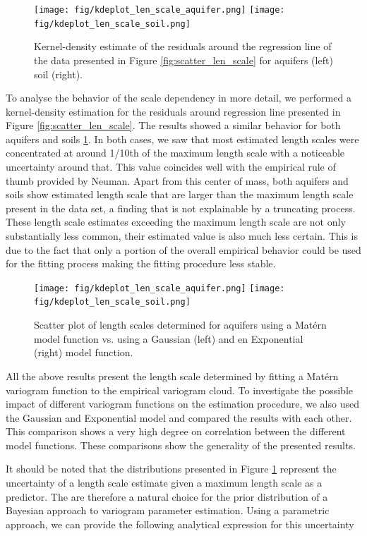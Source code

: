 \documentclass{article}
\begin{document}
\begin{figure}[ht]
    \texttt{[image: fig/kdeplot\_len\_scale\_aquifer.png]}
    \texttt{[image: fig/kdeplot\_len\_scale\_soil.png]}
    \caption{Kernel-density estimate of the residuals around the regression line of the data presented in Figure \ref{fig:scatter_len_scale} for aquifers (left) soil (right).}
    \label{fig:kdeplot_len_scale}
\end{figure}

To analyse the behavior of the scale dependency in more detail, we performed a kernel-density estimation for the residuals around regression line presented in Figure \ref{fig:scatter_len_scale}. The results showed a similar behavior for both aquifers and soils \ref{fig:kdeplot_len_scale}. In both cases, we saw that most estimated length scales were concentrated at around 1/10th of the maximum length scale with a noticeable uncertainty around that. This value coincides well with the empirical rule of thumb provided by Neuman. Apart from this center of mass, both aquifers and soils show estimated length scale that are larger than the maximum length scale present in the data set, a finding that is not explainable by a truncating process. These length scale estimates exceeding the maximum length scale are not only substantially less common, their estimated value is also much less certain. This is due to the fact that only a portion of the overall empirical behavior could be used for the fitting process making the fitting procedure less stable.

\begin{figure}[ht]
    \texttt{[image: fig/kdeplot\_len\_scale\_aquifer.png]}
    \texttt{[image: fig/kdeplot\_len\_scale\_soil.png]}
    \caption{Scatter plot of length scales determined for aquifers using a Mat{\'e}rn model function vs. using a Gaussian (left) and en Exponential (right) model function.}
    \label{fig:different_models_len_scale}
\end{figure}

All the above results present the length scale determined by fitting a Mat{\'e}rn variogram function to the empirical variogram cloud. To investigate the possible impact of different variogram functions on the estimation procedure, we also used the Gaussian and Exponential model and compared the results with each other. This comparison shows a very high degree on correlation between the different model functions. These comparisons show the generality of the presented results.

It should be noted that the distributions presented in Figure \ref{fig:kdeplot_len_scale} represent the uncertainty of a length scale estimate given a maximum length scale as a predictor. The are therefore a natural choice for the prior distribution of a Bayesian approach to variogram parameter estimation. Using a parametric approach, we can provide the following analytical expression for this uncertainty 
\end{document}
